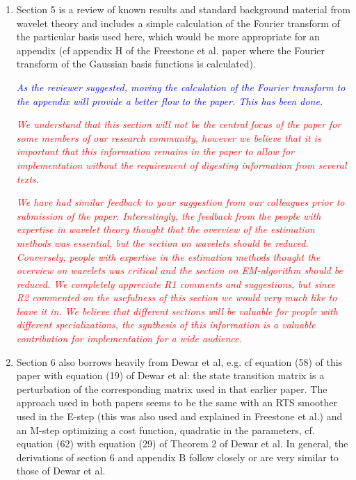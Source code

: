 \documentclass{article}
\newcommand{\dean}[1]{\textcolor{red}{#1}}
\newcommand{\parham}[1]{\textcolor{blue}{#1}}
\begin{document}
\begin{enumerate}
        \item Section 5 is a review of known results and standard background material from wavelet theory and includes a simple calculation of the Fourier transform of the particular basis used here, which would be more appropriate for an appendix (cf appendix H of the Freestone et al. paper where the Fourier transform of the Gaussian basis functions is calculated).


\emph{\parham{As the reviewer suggested, moving the calculation of the Fourier transform to the appendix will provide a better flow to the paper. This has been done.}}

\emph{\dean{We understand that this section will not be the central focus of the paper for some members of our research community, however we believe that it is important that this information remains in the paper to allow for implementation without the requirement of digesting information from several texts.}} 

\emph{\dean{We have had similar feedback to your suggestion from our colleagues prior to submission of the paper. Interestingly, the feedback from the people with expertise in wavelet theory thought that the overview of the estimation methods was essential, but the section on wavelets should be reduced. Conversely, people with expertise in the estimation methods thought the overview on wavelets was critical and the section on EM-algorithm should be reduced. We completely appreciate R1 comments and suggestions, but since R2 commented on the usefulness of this section we would very much like to leave it in. We believe that different sections will be valuable for people with different specializations, the synthesis of this information is a valuable contribution for implementation for a wide audience.}}

        \item Section 6 also borrows heavily from Dewar et al, e.g. cf equation (58) of this paper with equation (19) of Dewar et al: the state transition matrix is a perturbation of the corresponding matrix used in that earlier paper. The approach used in both papers seems to be the same with an RTS smoother used in the E-step (this was also used and explained in Freestone et al.) and an M-step optimizing a cost function, quadratic in the parameters, cf. equation (62) with equation (29) of Theorem 2 of Dewar et al. In general, the derivations of section 6 and appendix B follow closely or are very similar to those of Dewar et al.


\end{enumerate}
\end{document}

